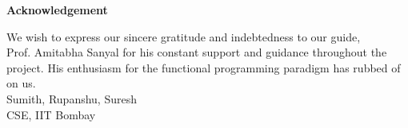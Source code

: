 \begin{center}
{\large \bfseries
Acknowledgement
}~\\[1cm]
\end{center}
\begin{flushleft}
{
We wish to express our sincere gratitude and indebtedness to our guide, \\ Prof. Amitabha Sanyal for his constant support and guidance throughout the project. His enthusiasm for the functional programming paradigm has rubbed of on us.
}~\\[1.5cm]
{
Sumith, Rupanshu, Suresh\\
CSE, IIT Bombay
}
\end{flushleft}
